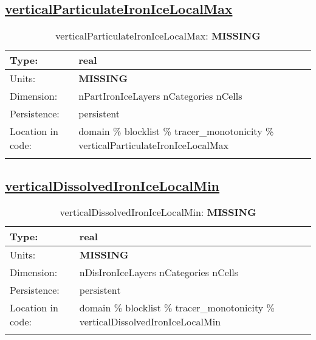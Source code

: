 \subsection[verticalParticulateIronIceLocalMax]{\hyperref[sec:var_tab_tracer_monotonicity]{verticalParticulateIronIceLocalMax}}
\label{subsec:var_sec_tracer_monotonicity_verticalParticulateIronIceLocalMax}
\begin{center}
\begin{longtable}{| p{2.0in} | p{4.0in} |}
        \hline 
        Type: & real \\
        \hline 
        Units: & {\bf \color{red} MISSING} \\
        \hline 
        Dimension: & nPartIronIceLayers nCategories nCells \\
        \hline 
        Persistence: & persistent \\
        \hline 
         Location in code: & domain \% blocklist \% tracer\_monotonicity \% verticalParticulateIronIceLocalMax \\
         \hline 
    \caption{verticalParticulateIronIceLocalMax: {\bf \color{red} MISSING}}
\end{longtable}
\end{center}
\subsection[verticalDissolvedIronIceLocalMin]{\hyperref[sec:var_tab_tracer_monotonicity]{verticalDissolvedIronIceLocalMin}}
\label{subsec:var_sec_tracer_monotonicity_verticalDissolvedIronIceLocalMin}
\begin{center}
\begin{longtable}{| p{2.0in} | p{4.0in} |}
        \hline 
        Type: & real \\
        \hline 
        Units: & {\bf \color{red} MISSING} \\
        \hline 
        Dimension: & nDisIronIceLayers nCategories nCells \\
        \hline 
        Persistence: & persistent \\
        \hline 
         Location in code: & domain \% blocklist \% tracer\_monotonicity \% verticalDissolvedIronIceLocalMin \\
         \hline 
    \caption{verticalDissolvedIronIceLocalMin: {\bf \color{red} MISSING}}
\end{longtable}
\end{center}
